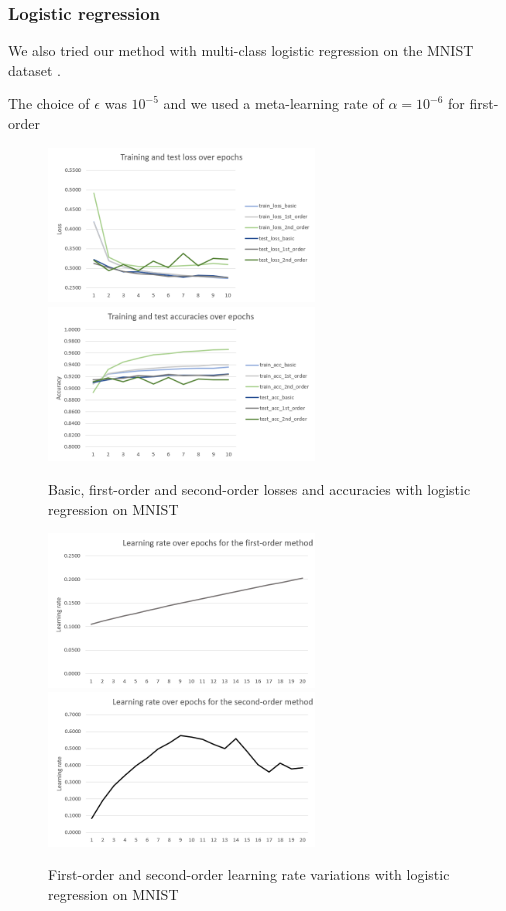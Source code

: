 \documentclass{article}
\begin{document}
  
  \subsubsection{Logistic regression}
  
  We also tried our method with multi-class logistic regression on the MNIST dataset \cite{xiao2017fashion}.
  
  The choice of $\epsilon$ was $10^{-5}$ and we used a meta-learning rate of $\alpha=10^{-6}$ for first-order
  \begin{figure}[!h]
	\includegraphics[width=200pt]{loss_logistic.png}
	\includegraphics[width=200pt]{acc_logistic.png}
	\caption{Basic, first-order and second-order losses and accuracies with logistic regression on MNIST}
  \end{figure}  

  \begin{figure}[!h]
	\includegraphics[width=200pt]{lr_logistic_1st_order.png}
	\includegraphics[width=200pt]{lr_logistic_2nd_order.png}
	\caption{First-order and second-order learning rate variations with logistic regression on MNIST}
  \end{figure} 
\end{document}
